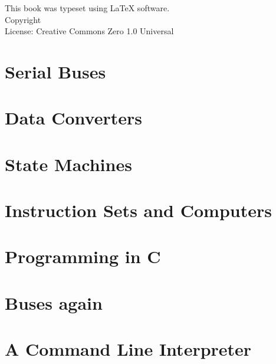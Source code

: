 \documentclass{book}
\makeatletter
\newcommand{\booklicense}{Creative Commons Zero 1.0 Universal}
\newcommand{\bookauthor}{\@author}
\makeatother
\begin{document}
\thispagestyle{empty}

\begin{flushleft}
\vspace*{\fill}
This book was typeset using \LaTeX{} software.\\
\vspace{\fill}
Copyright \textcopyright{} \the\year{}  \bookauthor\\
License: \booklicense
\end{flushleft}

\addtocounter{page}{2}



\setcounter{tocdepth}{3}
\tableofcontents

\mainmatter







\chapter{Serial Buses }
\chapter{Data Converters}
\chapter{State Machines}
\chapter{Instruction Sets and Computers}
\chapter{Programming in C}
\chapter{Buses again}
\chapter{A Command Line Interpreter}
\end{document}
